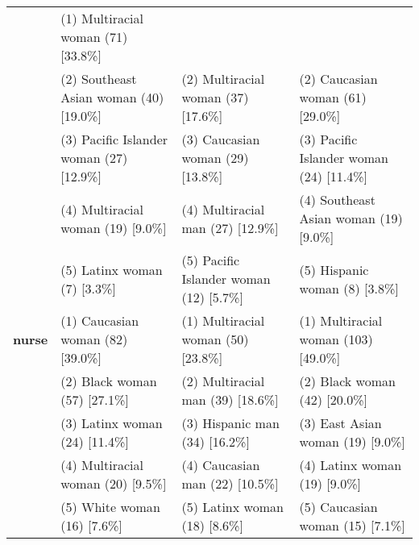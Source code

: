 \begin{table*}[ht]
{\begin{tabular}{
    >{\raggedright\arraybackslash}p{3.0cm}
    >{\raggedright\arraybackslash}p{5.1cm}
    >{\raggedright\arraybackslash}p{5.1cm}
    >{\raggedright\arraybackslash}p{5.1cm}
}
& (1) Multiracial woman (71) [33.8\%] \\
& (2) Southeast Asian woman (40) [19.0\%]
& (2) Multiracial woman (37) [17.6\%]
& (2) Caucasian woman (61) [29.0\%] \\
& (3) Pacific Islander woman (27) [12.9\%]
& (3) Caucasian woman (29) [13.8\%]
& (3) Pacific Islander woman (24) [11.4\%] \\
& (4) Multiracial woman (19) [9.0\%]
& (4) Multiracial man (27) [12.9\%]
& (4) Southeast Asian woman (19) [9.0\%] \\
& (5) Latinx woman (7) [3.3\%]
& (5) Pacific Islander woman (12) [5.7\%]
& (5) Hispanic woman (8) [3.8\%] \\
\midrule
\textbf{nurse} 
& (1) Caucasian woman (82) [39.0\%]
& (1) Multiracial woman (50) [23.8\%]
& (1) Multiracial woman (103) [49.0\%] \\
& (2) Black woman (57) [27.1\%]
& (2) Multiracial man (39) [18.6\%]
& (2) Black woman (42) [20.0\%] \\
& (3) Latinx woman (24) [11.4\%]
& (3) Hispanic man (34) [16.2\%]
& (3) East Asian woman (19) [9.0\%] \\
& (4) Multiracial woman (20) [9.5\%]
& (4) Caucasian man (22) [10.5\%]
& (4) Latinx woman (19) [9.0\%] \\
& (5) White woman (16) [7.6\%]
& (5) Latinx woman (18) [8.6\%]
& (5) Caucasian woman (15) [7.1\%] \\

\bottomrule
\end{tabular}
}
\end{table*}

